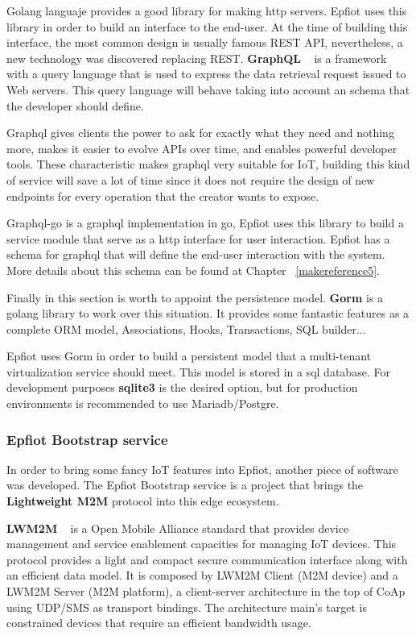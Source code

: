 Golang languaje provides a good library for making http servers. Epfiot uses this library in order to build an interface to the end-user. At the time of building this interface, the most common design is usually famous REST API, nevertheless, a new technology was discovered replacing REST.
\textbf{GraphQL} ~\cite{graphqh_paper} is a framework with a query language that is used to express the data retrieval request issued to Web servers. This query language will behave taking into account an schema that the developer should define.

Graphql gives clients the power to ask for exactly what they need and nothing more, makes it easier to evolve APIs over time, and enables powerful developer tools. These characteristic makes graphql very suitable for IoT, building this kind of service will save a lot of time since it does not require the design of new endpoints for every operation that the creator wants to expose.

Graphql-go is a graphql implementation in go, Epfiot uses this library to build a service module that serve as a http interface for user interaction. Epfiot has a schema for graphql that will define the end-user interaction with the system. More details about this schema can be found at Chapter ~\ref{makereference5}.

Finally in this section is worth to appoint the persistence model.
\textbf{Gorm} is a golang library to work over this situation. It provides some fantastic features as a complete ORM model, Associations, Hooks, Transactions, SQL builder...

Epfiot uses Gorm in order to build a persistent model that a multi-tenant virtualization service should meet. This model is stored in a sql database. For development purposes \textbf{sqlite3} is the desired option, but for production environments is recommended to use Mariadb/Postgre.

\subsubsection{Epfiot Bootstrap service}

In order to bring some fancy IoT features into Epfiot, another piece of software was developed. The Epfiot Bootstrap service is a project that brings the \textbf{Lightweight M2M} protocol into this edge ecosystem.

\textbf{LWM2M} ~\cite{lwm2m_paper} is a Open Mobile Alliance standard that provides device management and service enablement capacities for managing IoT devices.
This protocol provides a light and compact secure communication interface along with an efficient data model. It is composed by LWM2M Client (M2M device) and a LWM2M Server (M2M platform), a client-server architecture in the top of CoAp using UDP/SMS as transport bindings. The architecture main's target is constrained devices that require an efficient bandwidth usage. ~\cite{IEE:lwm2m:2015}


